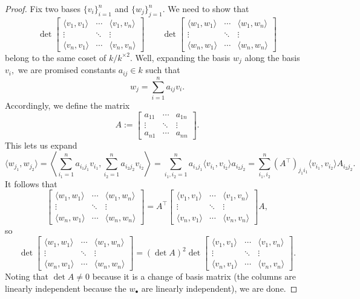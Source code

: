 \begin{proof}
	Fix two bases $\{v_i\}_{i=1}^n$ and $\{w_j\}_{j=1}^n.$ We need to show that
	\[\det\begin{bmatrix}
		\langle v_1,v_1\rangle & \cdots & \langle v_1,v_n\rangle \\
		\vdots & \ddots & \vdots \\
		\langle v_n,v_1\rangle & \cdots & \langle v_n,v_n\rangle
	\end{bmatrix}\qquad\det\begin{bmatrix}
		\langle w_1,w_1\rangle & \cdots & \langle w_1,w_n\rangle \\
		\vdots & \ddots & \vdots \\
		\langle w_n,w_1\rangle & \cdots & \langle w_n,w_n\rangle
	\end{bmatrix}\]
	belong to the same coset of $k/k^{\times2}.$ Well, expanding the basis $w_j$ along the basis $v_i,$ we are promised constants $a_{ij}\in k$ such that
	\[w_j=\sum_{i=1}^na_{ij}v_i.\]
	Accordingly, we define the matrix
	\[A:=\begin{bmatrix}
		a_{11} & \cdots & a_{1n} \\
		\vdots & \ddots & \vdots \\
		a_{n1} & \cdots & a_{nn}
	\end{bmatrix}.\]
	This lets us expand
	\[\langle w_{j_1},w_{j_2}\rangle=\left\langle\sum_{i_1=1}^na_{i_1j_1}v_{i_1},\sum_{i_2=1}^na_{i_2j_2}v_{i_2}\right\rangle=\sum_{i_1,i_2=1}^na_{i_1j_1}\langle v_{i_1},v_{i_2}\rangle a_{i_2j_2}=\sum_{i_1,i_2}^n(A^\intercal)_{j_1i_1}\langle v_{i_1},v_{i_2}\rangle A_{i_2j_2}.\]
	It follows that
	\[\begin{bmatrix}
		\langle w_1,w_1\rangle & \cdots & \langle w_1,w_n\rangle \\
		\vdots & \ddots & \vdots \\
		\langle w_n,w_1\rangle & \cdots & \langle w_n,w_n\rangle
	\end{bmatrix}=A^\intercal\begin{bmatrix}
		\langle v_1,v_1\rangle & \cdots & \langle v_1,v_n\rangle \\
		\vdots & \ddots & \vdots \\
		\langle v_n,v_1\rangle & \cdots & \langle v_n,v_n\rangle
	\end{bmatrix}A,\]
	so
	\[\det\begin{bmatrix}
		\langle w_1,w_1\rangle & \cdots & \langle w_1,w_n\rangle \\
		\vdots & \ddots & \vdots \\
		\langle w_n,w_1\rangle & \cdots & \langle w_n,w_n\rangle
	\end{bmatrix}=(\det A)^2\det\begin{bmatrix}
		\langle v_1,v_1\rangle & \cdots & \langle v_1,v_n\rangle \\
		\vdots & \ddots & \vdots \\
		\langle v_n,v_1\rangle & \cdots & \langle v_n,v_n\rangle
	\end{bmatrix}.\]
	Noting that $\det A\ne0$ because it is a change of basis matrix (the columns are linearly independent because the $w_\bullet$ are linearly independent), we are done.
\end{proof}
